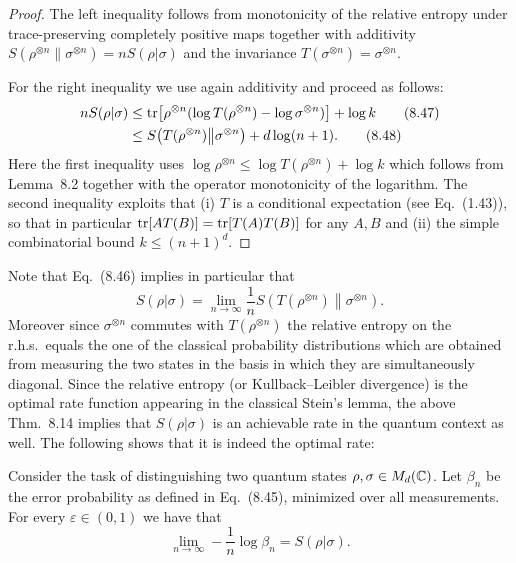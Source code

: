 \documentclass[11pt,a4paper]{article}
\theoremstyle{plain}
\theoremstyle{definition}
\theoremstyle{remark}
\begin{document}
\begin{proof}
    The left inequality follows from monotonicity of the relative entropy under trace-preserving completely positive maps together with additivity
    $S(\rho^{\otimes n}\|\sigma^{\otimes n})=nS(\rho|\sigma)$ and the invariance $T(\sigma^{\otimes n})=\sigma^{\otimes n}$.

    For the right inequality we use again additivity and proceed as follows:
    \begin{align}
        nS(\rho|\sigma)
         &\le \operatorname{tr}\!\left[\rho^{\otimes n}(\log T(\rho^{\otimes n})-\log\sigma^{\otimes n})\right] + \log k \tag{8.47}\\
         &\le S\!\left(T(\rho^{\otimes n})\middle\|\sigma^{\otimes n}\right) + d\log(n+1). \tag{8.48}
    \end{align}
    Here the first inequality uses $\log\rho^{\otimes n} \le \log T(\rho^{\otimes n}) + \log k$ which follows from Lemma~8.2 together with the operator monotonicity
    of the logarithm. The second inequality exploits that (i) $T$ is a conditional expectation (see Eq.~(1.43)), so that in particular
    $\operatorname{tr}[AT(B)]=\operatorname{tr}[T(A)T(B)]$ for any $A,B$ and (ii) the simple combinatorial bound $k\le (n+1)^d$.
\end{proof}

Note that Eq.~(8.46) implies in particular that
\begin{equation}\tag{8.49}
    S(\rho|\sigma)=\lim_{n\to\infty}\frac{1}{n}S\!\left(T(\rho^{\otimes n})\middle\|\sigma^{\otimes n}\right).
\end{equation}
Moreover since $\sigma^{\otimes n}$ commutes with $T(\rho^{\otimes n})$ the relative entropy on the r.h.s.\ equals the one of the classical probability distributions
which are obtained from measuring the two states in the basis in which they are simultaneously diagonal. Since the relative entropy (or Kullback--Leibler divergence)
is the optimal rate function appearing in the classical Stein's lemma, the above Thm.~8.14 implies that $S(\rho|\sigma)$ is an achievable rate in the quantum context as well.
The following shows that it is indeed the optimal rate:

\begin{theorem}
    Consider the task of distinguishing two quantum states $\rho,\sigma\in M_d(\mathbb{C})$.
    Let $\beta_n$ be the error probability as defined in Eq.~(8.45), minimized over all measurements.
    For every $\varepsilon\in(0,1)$ we have that
    \begin{equation}\tag{8.50}
        \lim_{n\to\infty} -\frac{1}{n}\log \beta_n = S(\rho|\sigma).
    \end{equation}
\end{theorem}
\end{document}
